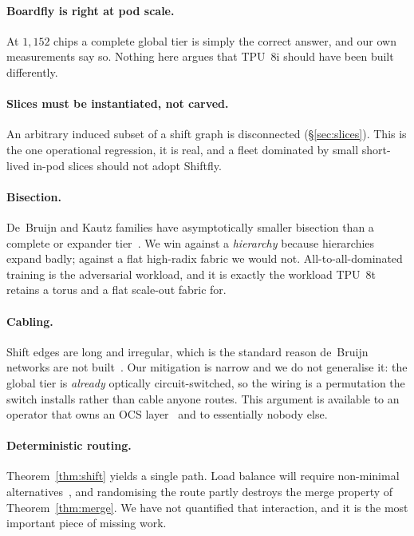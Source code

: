 \documentclass[sigconf,nonacm]{acmart}
\theoremstyle{acmdefinition}%
\begin{document}
\paragraph{Boardfly is right at pod scale.} At $1{,}152$ chips a complete global
tier is simply the correct answer, and our own measurements say so. Nothing here
argues that TPU~8i should have been built differently.

\paragraph{Slices must be instantiated, not carved.} An arbitrary induced subset
of a shift graph is disconnected (\S\ref{sec:slices}). This is the one
operational regression, it is real, and a fleet dominated by small short-lived
in-pod slices should not adopt Shiftfly.

\paragraph{Bisection.} De~Bruijn and Kautz families have asymptotically smaller
bisection than a complete or expander tier~\cite{bermond1989debruijn}. We win
against a \emph{hierarchy} because hierarchies expand badly; against a flat
high-radix fabric we would not. All-to-all-dominated training is the adversarial
workload, and it is exactly the workload TPU~8t retains a torus and a flat
scale-out fabric for.

\paragraph{Cabling.} Shift edges are long and irregular, which is the standard
reason de~Bruijn networks are not built~\cite{bermond1989debruijn}. Our
mitigation is narrow and we do not generalise it: the global tier is
\emph{already} optically circuit-switched, so the wiring is a permutation the
switch installs rather than cable anyone routes. This argument is available to
an operator that owns an OCS layer~\cite{poutievski2022jupiter} and to
essentially nobody else.

\paragraph{Deterministic routing.} Theorem~\ref{thm:shift} yields a single path.
Load balance will require non-minimal
alternatives~\cite{valiant1982,jiang2009ugal}, and randomising the route partly
destroys the merge property of Theorem~\ref{thm:merge}. We have not quantified
that interaction, and it is the most important piece of missing work.
\end{document}
